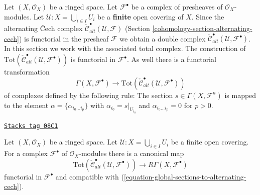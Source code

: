 \medskip\noindent
Let $(X, \mathcal{O}_X)$ be a ringed space.
Let ${\mathcal F}^\bullet$ be a complex of presheaves of
$\mathcal{O}_X$-modules. Let ${\mathcal U} : X = \bigcup_{i \in I} U_i$
be a {\bf finite} open covering of $X$. Since the alternating
{\v C}ech complex
$\check{\mathcal{C}}_{alt}^\bullet(\mathcal{U}, \mathcal{F})$
(Section \ref{cohomology-section-alternating-cech})
is functorial in the presheaf $\mathcal{F}$ we obtain a double complex
$\check{\mathcal{C}}^\bullet_{alt}(\mathcal{U}, \mathcal{F}^\bullet)$.
In this section we work with the associated total complex.
The construction of
$\text{Tot}(\check{\mathcal{C}}^\bullet_{alt}({\mathcal U},
{\mathcal F}^\bullet))$
is functorial in ${\mathcal F}^\bullet$. As well there is a functorial
transformation
\begin{equation}
\label{equation-global-sections-to-alternating-cech}
\Gamma(X, {\mathcal F}^\bullet)
\longrightarrow
\text{Tot}(\check{\mathcal{C}}^\bullet_{alt}({\mathcal U},
{\mathcal F}^\bullet))
\end{equation}
of complexes defined by the following rule: The section
$s\in \Gamma(X, {\mathcal F}^n)$
is mapped to the element $\alpha = \{\alpha_{i_0\ldots i_p}\}$
with $\alpha_{i_0} = s|_{U_{i_0}}$ and $\alpha_{i_0\ldots i_p} = 0$
for $p > 0$.

\begin{lemma}
\label{cohomology-lemma-alternating-cech-complex-complex}
\href{https://stacks.math.columbia.edu/tag/08C1}{\texttt{Stacks tag 08C1}}

Let $(X, \mathcal{O}_X)$ be a ringed space.
Let $\mathcal{U} : X = \bigcup_{i \in I} U_i$ be
a finite open covering. For a complex $\mathcal{F}^\bullet$
of $\mathcal{O}_X$-modules there is a canonical map
$$
\text{Tot}(\check{\mathcal{C}}^\bullet_{alt}(\mathcal{U}, \mathcal{F}^\bullet))
\longrightarrow
R\Gamma(X, \mathcal{F}^\bullet)
$$
functorial in $\mathcal{F}^\bullet$ and compatible with
(\ref{equation-global-sections-to-alternating-cech}).
\end{lemma}

